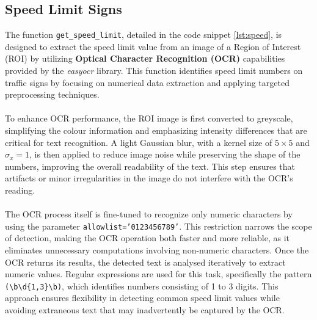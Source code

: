 \documentclass[10pt,conference,a4paper]{IEEEtran}
\begin{document}
\subsection{Speed Limit Signs}\label{sec:speed}
The function \texttt{get\_speed\_limit}, detailed in the code snippet \ref{lst:speed}, is designed to extract the speed limit value from an image of a Region of Interest (ROI) by utilizing \textbf{Optical Character Recognition (OCR)} capabilities provided by the \textit{easyocr} library. This function identifies speed limit numbers on traffic signs by focusing on numerical data extraction and applying targeted preprocessing techniques.\\\\
To enhance OCR performance, the ROI image is first converted to greyscale, simplifying the colour information and emphasizing intensity differences that are critical for text recognition. A light Gaussian blur, with a kernel size of $5 \times 5$ and $\sigma_x = 1$, is then applied to reduce image noise while preserving the shape of the numbers, improving the overall readability of the text. This step ensures that artifacts or minor irregularities in the image do not interfere with the OCR's reading.\\\\
The OCR process itself is fine-tuned to recognize only numeric characters by using the parameter \texttt{allowlist='0123456789'}. This restriction narrows the scope of detection, making the OCR operation both faster and more reliable, as it eliminates unnecessary computations involving non-numeric characters. Once the OCR returns its results, the detected text is analysed iteratively to extract numeric values. Regular expressions are used for this task, specifically the pattern \verb|(\b\d{1,3}\b)|, which identifies numbers consisting of 1 to 3 digits. This approach ensures flexibility in detecting common speed limit values while avoiding extraneous text that may inadvertently be captured by the OCR.
\end{document}
